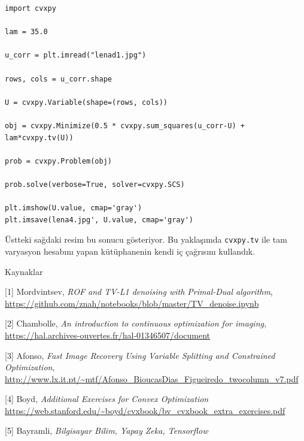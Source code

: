 \documentclass[12pt,fleqn]{article}\usepackage{../../common}
\begin{document}
\begin{verbatim}
import cvxpy

lam = 35.0

u_corr = plt.imread("lenad1.jpg")

rows, cols = u_corr.shape

U = cvxpy.Variable(shape=(rows, cols))

obj = cvxpy.Minimize(0.5 * cvxpy.sum_squares(u_corr-U) + lam*cvxpy.tv(U))

prob = cvxpy.Problem(obj)

prob.solve(verbose=True, solver=cvxpy.SCS)

plt.imshow(U.value, cmap='gray')
plt.imsave(lena4.jpg', U.value, cmap='gray')
\end{verbatim}

Üstteki sağdaki resim bu sonucu gösteriyor. Bu yaklaşımda
\verb!cvxpy.tv! ile tam varyasyon hesabını yapan kütüphanenin kendi iç
çağrısını kullandık. 


Kaynaklar

[1] Mordvintsev, {\em ROF and TV-L1 denoising with Primal-Dual algorithm},
    \url{https://github.com/znah/notebooks/blob/master/TV_denoise.ipynb}

[2] Chambolle, {\em An introduction to continuous optimization for imaging},
    \url{https://hal.archives-ouvertes.fr/hal-01346507/document}

[3] Afonso, {\em Fast Image Recovery Using Variable Splitting and Constrained Optimization},
    \url{http://www.lx.it.pt/~mtf/Afonso_BioucasDias_Figueiredo_twocolumn_v7.pdf}

[4] Boyd, 
    {\em Additional Exercises for Convex Optimization}
    \url{https://web.stanford.edu/~boyd/cvxbook/bv_cvxbook_extra_exercises.pdf}

[5] Bayramli, 
    {\em Bilgisayar Bilim, Yapay Zeka, Tensorflow}
\end{document}
